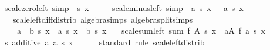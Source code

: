 \begin{isabellebody}
%
\endisadelimproof
\isanewline
{}\isamarkupfalse%
\ scale{\isacharunderscore}{\kern0pt}zero{\isacharunderscore}{\kern0pt}left\ {\isacharbrackleft}{\kern0pt}simp{\isacharbrackright}{\kern0pt}{\isacharcolon}{\kern0pt}\ {\isachardoublequoteopen}{}\ {\isacharasterisk}{\kern0pt}s\ x\ {\isacharequal}{\kern0pt}\ {}{\isachardoublequoteclose}\isanewline
\ \ \ scale{\isacharunderscore}{\kern0pt}minus{\isacharunderscore}{\kern0pt}left\ {\isacharbrackleft}{\kern0pt}simp{\isacharbrackright}{\kern0pt}{\isacharcolon}{\kern0pt}\ {\isachardoublequoteopen}{\isacharparenleft}{\kern0pt}{\isacharminus}{\kern0pt}\ a{\isacharparenright}{\kern0pt}\ {\isacharasterisk}{\kern0pt}s\ x\ {\isacharequal}{\kern0pt}\ {\isacharminus}{\kern0pt}\ {\isacharparenleft}{\kern0pt}a\ {\isacharasterisk}{\kern0pt}s\ x{\isacharparenright}{\kern0pt}{\isachardoublequoteclose}\isanewline
\ \ \ scale{\isacharunderscore}{\kern0pt}left{\isacharunderscore}{\kern0pt}diff{\isacharunderscore}{\kern0pt}distrib\ {\isacharbrackleft}{\kern0pt}algebra{\isacharunderscore}{\kern0pt}simps{\isacharcomma}{\kern0pt}\ algebra{\isacharunderscore}{\kern0pt}split{\isacharunderscore}{\kern0pt}simps{\isacharbrackright}{\kern0pt}{\isacharcolon}{\kern0pt}\isanewline
\ \ \ \ {\isachardoublequoteopen}{\isacharparenleft}{\kern0pt}a\ {\isacharminus}{\kern0pt}\ b{\isacharparenright}{\kern0pt}\ {\isacharasterisk}{\kern0pt}s\ x\ {\isacharequal}{\kern0pt}\ a\ {\isacharasterisk}{\kern0pt}s\ x\ {\isacharminus}{\kern0pt}\ b\ {\isacharasterisk}{\kern0pt}s\ x{\isachardoublequoteclose}\isanewline
\ \ \ scale{\isacharunderscore}{\kern0pt}sum{\isacharunderscore}{\kern0pt}left{\isacharcolon}{\kern0pt}\ {\isachardoublequoteopen}{\isacharparenleft}{\kern0pt}sum\ f\ A{\isacharparenright}{\kern0pt}\ {\isacharasterisk}{\kern0pt}s\ x\ {\isacharequal}{\kern0pt}\ {\isacharparenleft}{\kern0pt}{\isasymSum}a{\isasymin}A{\isachardot}{\kern0pt}\ {\isacharparenleft}{\kern0pt}f\ a{\isacharparenright}{\kern0pt}\ {\isacharasterisk}{\kern0pt}s\ x{\isacharparenright}{\kern0pt}{\isachardoublequoteclose}\isanewline
%
\isadelimproof
%
\endisadelimproof
%
\isatagproof
{}\isamarkupfalse%
\ {\isacharminus}{\kern0pt}\isanewline
\ \ \isamarkupfalse%
\ s{\isacharcolon}{\kern0pt}\ additive\ {\isachardoublequoteopen}{\isasymlambda}a{\isachardot}{\kern0pt}\ a\ {\isacharasterisk}{\kern0pt}s\ x{\isachardoublequoteclose}\isanewline
\ \ \ \ \isamarkupfalse%
\ standard\ {\isacharparenleft}{\kern0pt}rule\ scale{\isacharunderscore}{\kern0pt}left{\isacharunderscore}{\kern0pt}distrib{\isacharparenright}{\kern0pt}\isanewline

\end{isabellebody}
